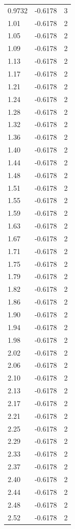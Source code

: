\begin{longtable}{lrr}
  0.9732 & -0.6178 & 3 \\
  1.01 & -0.6178 & 2 \\
  1.05 & -0.6178 & 2 \\
  1.09 & -0.6178 & 2 \\
  1.13 & -0.6178 & 2 \\
  1.17 & -0.6178 & 2 \\
  1.21 & -0.6178 & 2 \\
  1.24 & -0.6178 & 2 \\
  1.28 & -0.6178 & 2 \\
  1.32 & -0.6178 & 2 \\
  1.36 & -0.6178 & 2 \\
  1.40 & -0.6178 & 2 \\
  1.44 & -0.6178 & 2 \\
  1.48 & -0.6178 & 2 \\
  1.51 & -0.6178 & 2 \\
  1.55 & -0.6178 & 2 \\
  1.59 & -0.6178 & 2 \\
  1.63 & -0.6178 & 2 \\
  1.67 & -0.6178 & 2 \\
  1.71 & -0.6178 & 2 \\
  1.75 & -0.6178 & 2 \\
  1.79 & -0.6178 & 2 \\
  1.82 & -0.6178 & 2 \\
  1.86 & -0.6178 & 2 \\
  1.90 & -0.6178 & 2 \\
  1.94 & -0.6178 & 2 \\
  1.98 & -0.6178 & 2 \\
  2.02 & -0.6178 & 2 \\
  2.06 & -0.6178 & 2 \\
  2.10 & -0.6178 & 2 \\
  2.13 & -0.6178 & 2 \\
  2.17 & -0.6178 & 2 \\
  2.21 & -0.6178 & 2 \\
  2.25 & -0.6178 & 2 \\
  2.29 & -0.6178 & 2 \\
  2.33 & -0.6178 & 2 \\
  2.37 & -0.6178 & 2 \\
  2.40 & -0.6178 & 2 \\
  2.44 & -0.6178 & 2 \\
  2.48 & -0.6178 & 2 \\
  2.52 & -0.6178 & 2 \\

\end{longtable}
